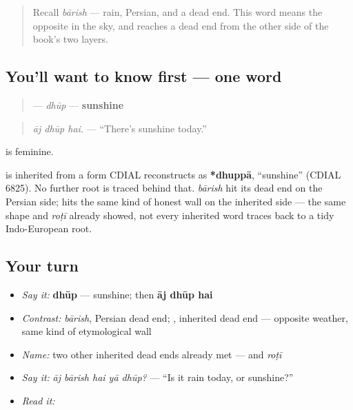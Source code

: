 \label{lesson:UR-C15-dhoop}



\begin{quote}
Recall \emph{bārish} — rain, Persian, and a dead end. This word means the opposite in the sky, and reaches a dead end from the other side of the book's two layers.
\end{quote}

\subsection*{You'll want to know first — one word}
\begin{quote}
\textbf{} — \emph{dhūp} — \textbf{sunshine}
\end{quote}

\begin{quote}
\emph{āj dhūp hai.} — \textquotedblleft{}There's sunshine today.\textquotedblright{}
\end{quote}

\textbf{} is feminine.

\begin{cousinweb}
\textbf{} is inherited from a form CDIAL reconstructs as \textbf{*dhuppā}, \textquotedblleft{}sunshine\textquotedblright{} (CDIAL 6825). No further root is traced behind that. \emph{bārish} hit its dead end on the Persian side; \textbf{} hits the same kind of honest wall on the inherited side — the same shape \textbf{} and \emph{roṭī} already showed, not every inherited word traces back to a tidy Indo-European root.
\end{cousinweb}

\subsection*{Your turn}
\begin{itemize}
\raggedright
  \item \emph{Say it:} \textbf{dhūp} — sunshine; then \textbf{āj dhūp hai}
  \item \emph{Contrast:} \emph{bārish}, Persian dead end; \textbf{}, inherited dead end — opposite weather, same kind of etymological wall
  \item \emph{Name:} two other inherited dead ends already met — \textbf{} and \emph{roṭī}
  \item \emph{Say it:} \emph{āj bārish hai yā dhūp?} — \textquotedblleft{}Is it rain today, or sunshine?\textquotedblright{}
  \item \emph{Read it:} \textbf{}
\end{itemize}

